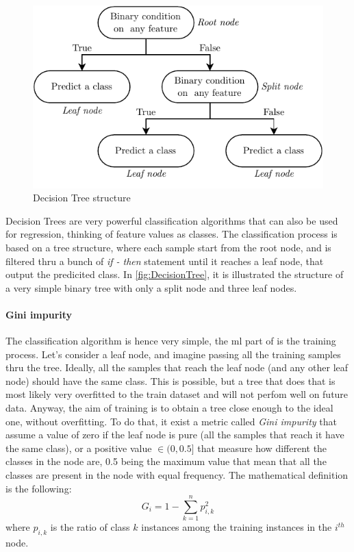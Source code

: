 \begin{figure}
    \centering
    \includegraphics[scale = 1]{images/MachineLearning/DT_structure.pdf}
    \caption{Decision Tree structure}
    \label{fig:DecisionTree}
\end{figure}

Decision Trees are very powerful classification algorithms that can also be used for regression, thinking of feature values as classes. The classification process is based on a tree structure, where each sample start from the root node, and is filtered thru a bunch of \emph{if - then} statement until it reaches a leaf node, that output the predicited class. In \autoref{fig:DecisionTree}, it is illustrated the structure of a very simple binary tree with only a split node and three leaf nodes.

\paragraph*{Gini impurity}
The classification algorithm is hence very simple, the \gls{ml} part of is the training process. Let's consider a leaf node, and imagine passing all the training samples thru the tree. Ideally, all the samples that reach the leaf node (and any other leaf node) should have the same class. This is possible, but a tree that does that is most likely very overfitted to the train dataset and will not perfom well on future data. Anyway, the aim of training is to obtain a tree close enough to the ideal one, without overfitting. To do that, it exist a metric called \emph{Gini impurity} that assume a value of zero if the leaf node is pure (all the samples that reach it have the same class), or a positive value $\in (0,0.5]$ that measure how different the classes in the node are, 0.5 being the maximum value that mean that all the classes are present in the node with equal frequency. The mathematical definition is the following:
\begin{equation}
    G_i = 1 - \sum_{k=1}^{n}p_{i,k}^2
\end{equation}
where $p_{i,k}$ is the ratio of class $k$ instances among the training instances in the $i^{th}$ node.

